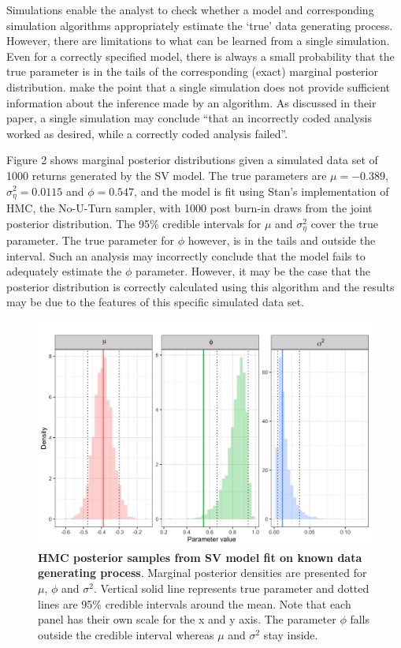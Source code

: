 \documentclass[12pt, a4paper]{article}
\begin{document}
    Simulations enable the analyst to check whether a model and corresponding simulation algorithms appropriately estimate the `true' data generating process. However, there are limitations to what can be learned from a single simulation. Even for a correctly specified model, there is always a small probability that the true parameter is in the tails of the corresponding (exact) marginal posterior distribution. \cite{talts2020validating} make the point that a single simulation does not provide sufficient information about the inference made by an algorithm. As discussed in their paper, a single simulation may conclude ``that an incorrectly coded analysis worked as desired, while a correctly coded analysis failed''. 

    Figure 2 shows marginal posterior distributions given a simulated data set of 1000 returns generated by the SV model. The true parameters are $\mu=-0.389$, $\sigma^2_{\eta}=0.0115$ and $\phi=0.547$, and the model is fit using Stan's implementation of HMC, the No-U-Turn sampler, with 1000 post burn-in draws from the joint posterior distribution. The 95\% credible intervals for $\mu$ and $\sigma^2_{\eta}$ cover the true parameter. The true parameter for $\phi$ however, is in the tails and outside the interval. Such an analysis may incorrectly conclude that the model fails to adequately estimate the $\phi$ parameter. However, it may be the case that the posterior distribution is correctly calculated using this algorithm and the results may be due to the features of this specific simulated data set.

    \begin{figure}[h]
        \centering
        \includegraphics[scale=0.1]{motivating_example/single_sim.png}
        \caption{\textbf{HMC posterior samples from SV model fit on known data generating process}. Marginal posterior densities are presented for $\mu$, $\phi$ and $\sigma^2$. Vertical solid line represents true parameter and dotted lines are 95\% credible intervals around the mean. Note that each panel has their own scale for the x and y axis. The parameter $\phi$ falls outside the credible interval whereas $\mu$ and $\sigma^2$ stay inside.}
    \end{figure}
\end{document}

